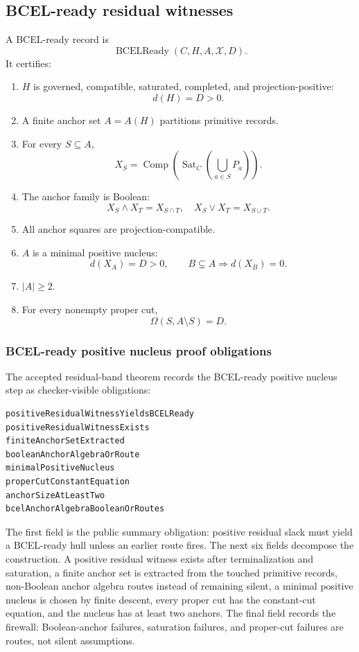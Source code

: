\documentclass[10.5pt,a4paper]{article}
\newcommand{\Sat}{\operatorname{Sat}}
\newcommand{\Comp}{\operatorname{Comp}}
\begin{document}
\subsection{BCEL-ready residual witnesses}
A BCEL-ready record is
\[
\operatorname{BCELReady}(C,H,A,\mathcal X,D).
\]
It certifies:
\begin{enumerate}
\item \(H\) is governed, compatible, saturated, completed, and projection-positive:
\[
d(H)=D>0.
\]
\item A finite anchor set \(A=A(H)\) partitions primitive records.
\item For every \(S\subseteq A\),
\[
X_S=\Comp(\Sat_C(\bigcup_{a\in S}P_a)).
\]
\item The anchor family is Boolean:
\[
X_S\wedge X_T=X_{S\cap T},\quad X_S\vee X_T=X_{S\cup T}.
\]
\item All anchor squares are projection-compatible.
\item \(A\) is a minimal positive nucleus:
\[
d(X_A)=D>0,
\qquad B\subsetneq A\Rightarrow d(X_B)=0.
\]
\item \(|A|\ge2\).
\item For every nonempty proper cut,
\[
\Omega(S,A\setminus S)=D.
\]
\end{enumerate}

\subsubsection{BCEL-ready positive nucleus proof obligations}
The accepted residual-band theorem records the BCEL-ready positive nucleus step as checker-visible obligations:
\begin{lstlisting}
positiveResidualWitnessYieldsBCELReady
positiveResidualWitnessExists
finiteAnchorSetExtracted
booleanAnchorAlgebraOrRoute
minimalPositiveNucleus
properCutConstantEquation
anchorSizeAtLeastTwo
bcelAnchorAlgebraBooleanOrRoutes
\end{lstlisting}
The first field is the public summary obligation: positive residual slack must yield a BCEL-ready hull unless an earlier route fires.  The next six fields decompose the construction.  A positive residual witness exists after terminalization and saturation, a finite anchor set is extracted from the touched primitive records, non-Boolean anchor algebra routes instead of remaining silent, a minimal positive nucleus is chosen by finite descent, every proper cut has the constant-cut equation, and the nucleus has at least two anchors.  The final field records the firewall: Boolean-anchor failures, saturation failures, and proper-cut failures are routes, not silent assumptions.
\end{document}
